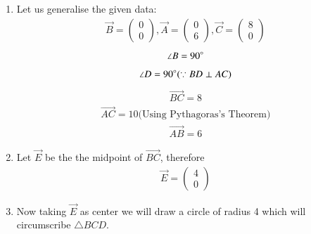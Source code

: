 \documentclass[journal,12pt,twocolumn]{IEEEtran}
\newcommand{\myvec}[1]{\ensuremath{\begin{pmatrix}#1\end{pmatrix}}}
\begin{document}
\begin{enumerate}
    \item  Let us generalise the given data:
\begin{align}
\vec{B}= \myvec{0\\0}, \vec{A}=\myvec{0\\6}, \vec{C}= \myvec{8\\0}
\end{align}
\begin{align}
    \angle B= 90\degree
\end{align}
\begin{align}
    \angle D=90\degree (\because  BD \perp AC)
\end{align}
\begin{align}
    \vec{BC}=8
\end{align}
\begin{align}
    \vec{AC}=10 \text{(Using Pythagoras's Theorem)}
\end{align}
\begin{align}
    \vec{AB}=6
\end{align}
\item Let $\vec{E}$ be the the midpoint of $\vec{BC}$, therefore
\begin{align}
    \vec{E}= \myvec{4\\0}
    \end{align}
    \item Now taking $\vec{E}$ as center we will draw a circle of radius 4 which will circumscribe $\triangle BCD$.\\
    

\end{enumerate}
\end{document}
